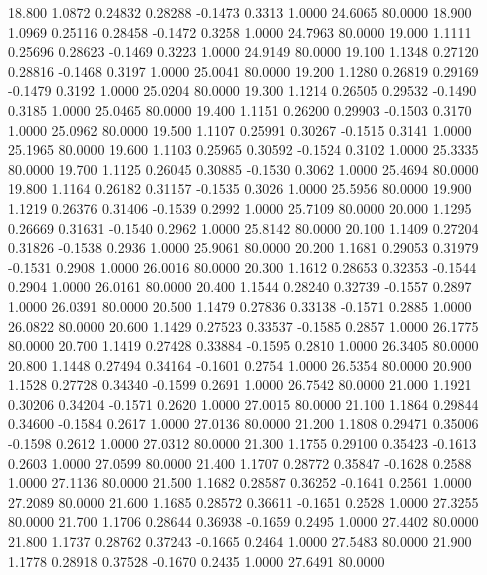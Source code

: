   18.800   1.0872   0.24832   0.28288  -0.1473   0.3313   1.0000  24.6065  80.0000
  18.900   1.0969   0.25116   0.28458  -0.1472   0.3258   1.0000  24.7963  80.0000
  19.000   1.1111   0.25696   0.28623  -0.1469   0.3223   1.0000  24.9149  80.0000
  19.100   1.1348   0.27120   0.28816  -0.1468   0.3197   1.0000  25.0041  80.0000
  19.200   1.1280   0.26819   0.29169  -0.1479   0.3192   1.0000  25.0204  80.0000
  19.300   1.1214   0.26505   0.29532  -0.1490   0.3185   1.0000  25.0465  80.0000
  19.400   1.1151   0.26200   0.29903  -0.1503   0.3170   1.0000  25.0962  80.0000
  19.500   1.1107   0.25991   0.30267  -0.1515   0.3141   1.0000  25.1965  80.0000
  19.600   1.1103   0.25965   0.30592  -0.1524   0.3102   1.0000  25.3335  80.0000
  19.700   1.1125   0.26045   0.30885  -0.1530   0.3062   1.0000  25.4694  80.0000
  19.800   1.1164   0.26182   0.31157  -0.1535   0.3026   1.0000  25.5956  80.0000
  19.900   1.1219   0.26376   0.31406  -0.1539   0.2992   1.0000  25.7109  80.0000
  20.000   1.1295   0.26669   0.31631  -0.1540   0.2962   1.0000  25.8142  80.0000
  20.100   1.1409   0.27204   0.31826  -0.1538   0.2936   1.0000  25.9061  80.0000
  20.200   1.1681   0.29053   0.31979  -0.1531   0.2908   1.0000  26.0016  80.0000
  20.300   1.1612   0.28653   0.32353  -0.1544   0.2904   1.0000  26.0161  80.0000
  20.400   1.1544   0.28240   0.32739  -0.1557   0.2897   1.0000  26.0391  80.0000
  20.500   1.1479   0.27836   0.33138  -0.1571   0.2885   1.0000  26.0822  80.0000
  20.600   1.1429   0.27523   0.33537  -0.1585   0.2857   1.0000  26.1775  80.0000
  20.700   1.1419   0.27428   0.33884  -0.1595   0.2810   1.0000  26.3405  80.0000
  20.800   1.1448   0.27494   0.34164  -0.1601   0.2754   1.0000  26.5354  80.0000
  20.900   1.1528   0.27728   0.34340  -0.1599   0.2691   1.0000  26.7542  80.0000
  21.000   1.1921   0.30206   0.34204  -0.1571   0.2620   1.0000  27.0015  80.0000
  21.100   1.1864   0.29844   0.34600  -0.1584   0.2617   1.0000  27.0136  80.0000
  21.200   1.1808   0.29471   0.35006  -0.1598   0.2612   1.0000  27.0312  80.0000
  21.300   1.1755   0.29100   0.35423  -0.1613   0.2603   1.0000  27.0599  80.0000
  21.400   1.1707   0.28772   0.35847  -0.1628   0.2588   1.0000  27.1136  80.0000
  21.500   1.1682   0.28587   0.36252  -0.1641   0.2561   1.0000  27.2089  80.0000
  21.600   1.1685   0.28572   0.36611  -0.1651   0.2528   1.0000  27.3255  80.0000
  21.700   1.1706   0.28644   0.36938  -0.1659   0.2495   1.0000  27.4402  80.0000
  21.800   1.1737   0.28762   0.37243  -0.1665   0.2464   1.0000  27.5483  80.0000
  21.900   1.1778   0.28918   0.37528  -0.1670   0.2435   1.0000  27.6491  80.0000
